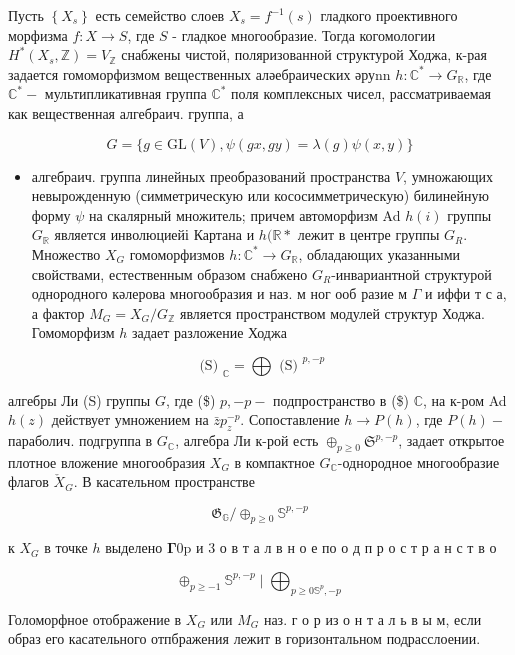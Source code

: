 \documentclass[10pt]{article}
\begin{document}
Пусть $\left\{X_{s}\right\}$ есть семейство слоев $X_{s}=f^{-1}(s)$ гладкого проективного морфизма $f: X \rightarrow S$, где $S$ - гладкое многообразие. Тогда когомологии $H^{*}\left(X_{s}, \mathbb{Z}\right)=V_{\mathbb{Z}}$ снабжены чистой, поляризованной структурой Ходжа, к-рая задается гомоморфизмом вещественных аләебраических әруnn $h: \mathbb{C}^{*} \rightarrow G_{\mathbb{R}}$, где $\mathbb{C}^{*}-$ мультипликативная группа $\mathbb{C}^{*}$ поля комплексных чисел, рассматриваемая как вещественная алгебраич. группа, а

\[
G=\{g \in \mathrm{GL}(V), \psi(g x, g y)=\lambda(g) \psi(x, y)\}
\]

\begin{itemize}
  \item алгебраич. группа линейных преобразований пространства $V$, умножающих невырожденную (симметрическую или кососимметрическую) билинейную форму $\psi$ на скалярный множитель; причем автоморфизм Ad $h(i)$ группы $G_{\mathbb{R}}$ является инволюциейі Картана и $h(\mathbb{R} *$ лежит в центре группы $G_{R}$. Множество $X_{G}$ гомоморфизмов $h: \mathbb{C}^{*} \rightarrow G_{\mathbb{R}}$, обладающих указанными свойствами, естественным образом снабжено $G_{R}$-инвариантной структурой однородного кәлерова многообразия и наз. м ног ооб разие м $\Gamma$ и иффи т с а, а фактор $M_{G}=X_{G} / G_{\mathbb{Z}}$ является пространством модулей структур Ходжа. Гомоморфизм $h$ задает разложение Ходжа
\end{itemize}

\[
\text { (S) }_{\mathbb{C}}=\bigoplus \text { (S) }^{p,-p}
\]

алгебры Ли (S) группы $G$, где (\$) $p,-p-$ подпространство в (\$) $\mathbb{C}$, на к-ром Ad $h(z)$ действует умножением на $\bar{z} p_{z}^{-p}$. Сопоставление $h \rightarrow P(h)$, где $P(h)-$ параболич. подгруппа в $G_{\mathbb{C}}$, алгебра Ли к-рой есть $\oplus_{p \geqslant 0} \mathfrak{S}^{p,-p}$, задает открытое плотное вложение многообразия $X_{G}$ в компактное $G_{\mathbb{C}}$-однородное многообразие флагов $\check{X}_{G}$. В касательном пространстве

\[
\mathfrak{G}_{\mathbb{G}} / \oplus_{p \geqslant 0} \mathbb{S}^{p,-p}
\]

к $X_{G}$ в точке $h$ выделено $\mathbf{\Gamma} 0 \mathrm{p}$ и 3 о в т а л в н о е по о д п р о с т р а н с т в о

\[
\oplus_{p \geqslant-1} \mathbb{S}^{p,-p} \mid \bigoplus_{p \geqslant 0 \mathbb{S}^{p},-p}
\]

Голоморфное отображение в $X_{G}$ или $M_{G}$ наз. г о р из о н т а л ь в ы м, если образ его касательного отпбражения лежит в горизонтальном подрасслоении.
\end{document}
